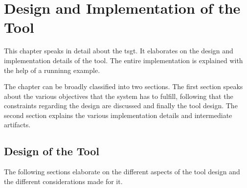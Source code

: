 \chapter{Design and Implementation of the Tool} \label{implementation} 
This chapter speaks in detail about the \gls{tsgt}. It elaborates on the design and implementation details of the tool. The entire implementation is explained with the help of a runninng example.
 
The chapter can be broadly classified into two sections. The first section speaks about the various objectives that the system has to fulfill, following that the constraints regarding the design are discussed and finally the tool design. The second section explains the various implementation details and intermediate artifacts.

\section{Design of the Tool}
The following sections elaborate on the different aspects of the tool design and the different considerations made for it.

